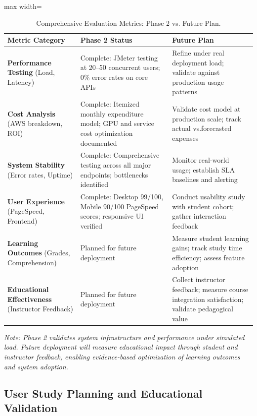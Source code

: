 \begin{table}[H]
    \centering
    \caption{Comprehensive Evaluation Metrics: Phase 2 vs. Future Plan.}
    \label{tab:evaluation_metrics}
    \begin{adjustbox}{max width=\linewidth}
    \begin{tabular}{lp{4.5cm}p{7cm}}
        \toprule
        \textbf{Metric Category} & \textbf{Phase 2 Status} & \textbf{Future Plan} \\
        \midrule
        \textbf{Performance Testing} (Load, Latency) & Complete: JMeter testing at 20--50 concurrent users; 0\% error rates on core APIs & Refine under real deployment load; validate against production usage patterns \\
        \textbf{Cost Analysis} (AWS breakdown, ROI) & Complete: Itemized monthly expenditure model; GPU and service cost optimization documented & Validate cost model at production scale; track actual vs.\@ forecasted expenses \\
        \textbf{System Stability} (Error rates, Uptime) & Complete: Comprehensive testing across all major endpoints; bottlenecks identified & Monitor real-world usage; establish SLA baselines and alerting \\
        \textbf{User Experience} (PageSpeed, Frontend) & Complete: Desktop 99/100, Mobile 90/100 PageSpeed scores; responsive UI verified & Conduct usability study with student cohort; gather interaction feedback \\
        \textbf{Learning Outcomes} (Grades, Comprehension) & Planned for future deployment & Measure student learning gains; track study time efficiency; assess feature adoption \\
        \textbf{Educational Effectiveness} (Instructor Feedback) & Planned for future deployment & Collect instructor feedback; measure course integration satisfaction; validate pedagogical value \\
        \bottomrule
    \end{tabular}
\end{adjustbox}
\end{table}

\textit{Note: Phase 2 validates system infrastructure and performance under simulated load. Future deployment will measure educational impact through student and instructor feedback, enabling evidence-based optimization of learning outcomes and system adoption.}

\subsection{User Study Planning and Educational Validation}

